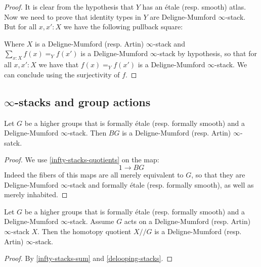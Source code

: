 \begin{proof}
It is clear from the hypothesis that $Y$ has an étale (resp. smooth) atlas. Now we need to prove that identity types in $Y$ are Deligne-Mumford $\infty$-stack. But for all $x,x':X$ we have the following pullback square:
 \begin{center}
  \end{center}
  Where $X$ is a Deligne-Mumford (resp. Artin) $\infty$-stack and $\sum_{x:X}f(x)=_Yf(x')$ is a Deligne-Mumford $\infty$-stack by hypothesis, so that for all $x,x':X$ we have that $f(x)=_Yf(x')$ is a Deligne-Mumford $\infty$-stack. We can conclude using the surjectivity of $f$.
\end{proof}

\subsection{$\infty$-stacks and group actions}

\begin{lemma}\label{delooping-stacks}
Let $G$ be a higher groups that is formally étale (resp. formally smooth) and a Deligne-Mumford $\infty$-stack. Then $BG$ is a Deligne-Mumford (resp. Artin) $\infty$-satck.
\end{lemma}

\begin{proof}
We use \cref{infty-stacks-quotients} on the map:
\[1\to BG\]
Indeed the fibers of this maps are all merely equivalent to $G$, so that they are Deligne-Mumford $\infty$-stack and formally étale (resp. formally smooth), as well as merely inhabited.
\end{proof}

\begin{corollary}
Let $G$ be a higher groups that is formally étale (resp. formally smooth) and a Deligne-Mumford $\infty$-stack. Assume $G$ acts on a Deligne-Mumford (resp. Artin) $\infty$-stack $X$. Then the homotopy quotient $X//G$ is a Deligne-Mumford (resp. Artin) $\infty$-stack.
\end{corollary}

\begin{proof}
By \cref{infty-stacks-sum} and \cref{delooping-stacks}.
\end{proof}

